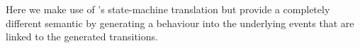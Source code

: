 Here we make use of \UMLB's state-machine translation but provide a completely different semantic by generating a behaviour into the underlying \EventB events that are linked to the generated \UMLB transitions.
